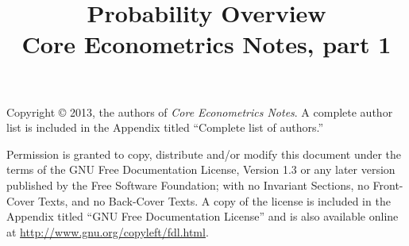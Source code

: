 \documentclass[nohyper]{tufte-handout}
\title[Probability overview]%
{Probability Overview \\
  Core Econometrics Notes, part 1}
\begin{document}
\maketitle

\bigskip\noindent%
Copyright © 2013, the authors of \textit{Core Econometrics Notes}.  A
complete author list is included in the Appendix titled ``Complete
list of authors.''

Permission is granted to copy, distribute and/or modify this document
under the terms of the GNU Free Documentation License, Version 1.3 or
any later version published by the Free Software Foundation; with no
Invariant Sections, no Front-Cover Texts, and no Back-Cover Texts.  A
copy of the license is included in the Appendix titled ``GNU Free
Documentation License'' and is also available online at
\url{http://www.gnu.org/copyleft/fdl.html}.

\tableofcontents
\listoftables
\listoffigures






\end{document}
